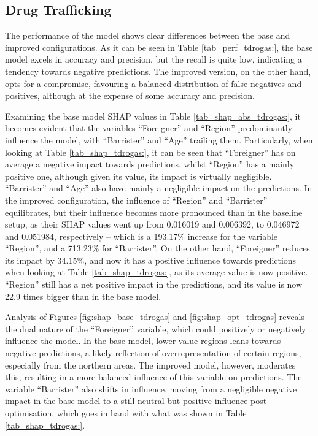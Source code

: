 \documentclass[twoside,11pt]{article}
\begin{document}
\subsection{Drug Trafficking}

The performance of the model shows clear differences between the base and improved configurations. As it can be seen in Table \ref{tab_perf_tdrogas:}, the base model excels in accuracy and precision, but the recall is quite low, indicating a tendency towards negative predictions. The improved version, on the other hand, opts for a compromise, favouring a balanced distribution of false negatives and positives, although at the expense of some accuracy and precision.

Examining the base model SHAP values in Table \ref{tab_shap_abs_tdrogas:}, it becomes evident that the variables ``Foreigner'' and ``Region'' predominantly influence the model, with ``Barrister'' and ``Age'' trailing them. Particularly, when looking at Table \ref{tab_shap_tdrogas:}, it can be seen that ``Foreigner'' has on average a negative impact towards predictions, whilst ``Region'' has a mainly positive one, although given its value, its impact is virtually negligible. ``Barrister'' and ``Age'' also have mainly a negligible impact on the predictions. In the improved configuration, the influence of ``Region'' and ``Barrister'' equilibrates, but their influence becomes more pronounced than in the baseline setup, as their SHAP values went up from 0.016019 and 0.006392, to 0.046972 and 0.051984, respectively -- which is a 193.17\% increase for the variable ``Region'', and a 713.23\% for ``Barrister''. On the other hand, ``Foreigner'' reduces its impact by 34.15\%, and now it has a positive influence towards predictions when looking at Table \ref{tab_shap_tdrogas:}, as its average value is now positive. ``Region'' still has a net positive impact in the predictions, and its value is now 22.9 times bigger than in the base model. 

Analysis of Figures \ref{fig:shap_base_tdrogas} and \ref{fig:shap_opt_tdrogas} reveals the dual nature of the ``Foreigner'' variable, which could positively or negatively influence the model. In the base model, lower value regions leans towards negative predictions, a likely reflection of overrepresentation of certain regions, especially from the northern areas. The improved model, however, moderates this, resulting in a more balanced influence of this variable on predictions. The variable ``Barrister'' also shifts in influence, moving from a negligible negative impact in the base model to a still neutral but positive influence post-optimisation, which goes in hand with what was shown in Table \ref{tab_shap_tdrogas:}.
\end{document}
